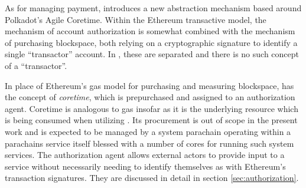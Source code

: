 As for managing payment, \Jam introduces a new abstraction mechanism based around Polkadot's Agile Coretime. Within the Ethereum transactive model, the mechanism of account authorization is somewhat combined with the mechanism of purchasing blockspace, both relying on a cryptographic signature to identify a single ``transactor'' account. In \Jam, these are separated and there is no such concept of a ``transactor''.

In place of Ethereum's gas model for purchasing and measuring blockspace, \Jam has the concept of \emph{coretime}, which is prepurchased and assigned to an authorization agent. Coretime is analogous to gas insofar as it is the underlying resource which is being consumed when utilizing \Jam. Its procurement is out of scope in the present work and is expected to be managed by a system parachain operating within a parachains service itself blessed with a number of cores for running such system services. The authorization agent allows external actors to provide input to a service without necessarily needing to identify themselves as with Ethereum's transaction signatures. They are discussed in detail in section \ref{sec:authorization}.
